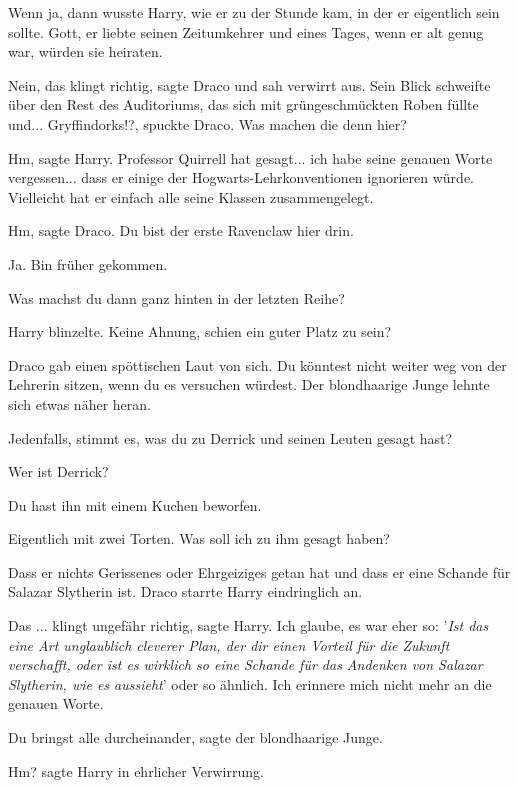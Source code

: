Wenn ja, dann wusste Harry, wie er zu der Stunde kam, in der er eigentlich sein
sollte. Gott, er liebte seinen Zeitumkehrer und eines Tages, wenn er alt genug
war, würden sie heiraten.

\glqq Nein, das klingt richtig\grqq{}, sagte Draco und sah verwirrt aus. Sein
Blick schweifte über den Rest des Auditoriums, das sich mit grüngeschmückten
Roben füllte und... \glqq Gryffindorks!?\grqq{}, spuckte Draco. \glqq Was
machen die denn hier?\grqq{}

\glqq Hm\grqq{}, sagte Harry. \glqq Professor Quirrell hat gesagt... ich habe
seine genauen Worte vergessen... dass er einige der Hogwarts-Lehrkonventionen
ignorieren würde. Vielleicht hat er einfach alle seine Klassen
zusammengelegt.\grqq{}

\glqq Hm\grqq{}, sagte Draco. \glqq Du bist der erste Ravenclaw hier
drin.\grqq{}

\glqq Ja. Bin früher gekommen.\grqq{}

\glqq Was machst du dann ganz hinten in der letzten Reihe?\grqq{}

Harry blinzelte. \glqq Keine Ahnung, schien ein guter Platz zu sein?\grqq{}

Draco gab einen spöttischen Laut von sich. \glqq Du könntest nicht weiter weg
von der Lehrerin sitzen, wenn du es versuchen würdest.\grqq{} Der blondhaarige
Junge lehnte sich etwas näher heran.

\glqq Jedenfalls, stimmt es, was du zu Derrick und seinen Leuten gesagt
hast?\grqq{}

\glqq Wer ist Derrick?\grqq{}

\glqq Du hast ihn mit einem Kuchen beworfen.\grqq{}

\glqq Eigentlich mit zwei Torten. Was soll ich zu ihm gesagt haben?\grqq{}

\glqq Dass er nichts Gerissenes oder Ehrgeiziges getan hat und dass er eine
Schande für Salazar Slytherin ist.\grqq{} Draco starrte Harry eindringlich an.

\glqq Das ... klingt ungefähr richtig\grqq{}, sagte Harry. \glqq Ich glaube, es
war eher so: '\emph{Ist das eine Art unglaublich cleverer Plan, der dir einen
Vorteil für die Zukunft verschafft, oder ist es wirklich so eine Schande für das
Andenken von Salazar Slytherin, wie es aussieht}' oder so ähnlich. Ich erinnere
mich nicht mehr an die genauen Worte.\grqq{}

\glqq Du bringst alle durcheinander\grqq{}, sagte der blondhaarige Junge.

\glqq Hm?\grqq{} sagte Harry in ehrlicher Verwirrung.

